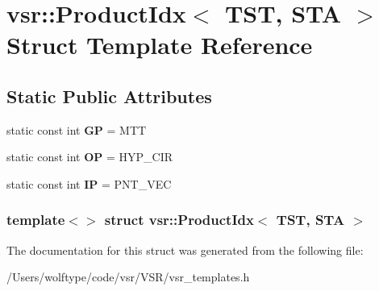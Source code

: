 \hypertarget{structvsr_1_1_product_idx_3_01_t_s_t_00_01_s_t_a_01_4}{\section{vsr\-:\-:Product\-Idx$<$ T\-S\-T, S\-T\-A $>$ Struct Template Reference}
\label{structvsr_1_1_product_idx_3_01_t_s_t_00_01_s_t_a_01_4}
}
\subsection*{Static Public Attributes}
\begin{DoxyCompactItemize}
\item 
\hypertarget{structvsr_1_1_product_idx_3_01_t_s_t_00_01_s_t_a_01_4_afb55a467eee4b0ada2e259535b358e41}{static const int {\bfseries G\-P} = M\-T\-T}\label{structvsr_1_1_product_idx_3_01_t_s_t_00_01_s_t_a_01_4_afb55a467eee4b0ada2e259535b358e41}

\item 
\hypertarget{structvsr_1_1_product_idx_3_01_t_s_t_00_01_s_t_a_01_4_a260a12324f6f4f80f942874dcccbb250}{static const int {\bfseries O\-P} = H\-Y\-P\-\_\-\-C\-I\-R}\label{structvsr_1_1_product_idx_3_01_t_s_t_00_01_s_t_a_01_4_a260a12324f6f4f80f942874dcccbb250}

\item 
\hypertarget{structvsr_1_1_product_idx_3_01_t_s_t_00_01_s_t_a_01_4_a1b697f44897487e857c1d84d34fcd44a}{static const int {\bfseries I\-P} = P\-N\-T\-\_\-\-V\-E\-C}\label{structvsr_1_1_product_idx_3_01_t_s_t_00_01_s_t_a_01_4_a1b697f44897487e857c1d84d34fcd44a}

\end{DoxyCompactItemize}
\subsubsection*{template$<$$>$ struct vsr\-::\-Product\-Idx$<$ T\-S\-T, S\-T\-A $>$}



The documentation for this struct was generated from the following file\-:\begin{DoxyCompactItemize}
\item 
/\-Users/wolftype/code/vsr/\-V\-S\-R/vsr\-\_\-templates.\-h\end{DoxyCompactItemize}
